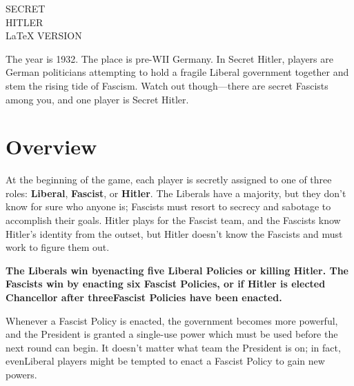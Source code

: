 \documentclass[13pt,a4paper,twocolumn,titlepage]{scrartcl}
\begin{document}
	\normalfont
	
	\begin{titlepage}
		\centering
		\vspace*{\fill}
		\fontsize{130}{130}\selectfont SECRET\\HITLER\\
		\vspace{2cm}
		\fontsize{45}{45}\selectfont LaTeX VERSION
		\vspace*{\fill}
	\end{titlepage}

	The year is 1932. The place is pre-WII Germany. In Secret Hitler​, players are German politicians attempting to hold a fragile \textcolor{liberal}{Liberal} government together and stem the rising tide of \textcolor{fascist}{Fascism}. Watch out though—there are secret \textcolor{fascist}{Fascists} among you, and one player is \textcolor{fascist}{Secret Hitler}.
	
	\section*{Overview}
	At the beginning of the game, each player is secretly assigned to one of three roles: 
	\textcolor{liberal}{\textbf{Liberal}}​, \textcolor{fascist}{\textbf{Fascist}​}, or \textcolor{fascist}{​\textbf{Hitler}​}. The \textcolor{liberal}{Liberals} have a majority, but they don’t know for sure who anyone is; \textcolor{fascist}{Fascists} must resort to secrecy and sabotage to accomplish their goals. \textcolor{fascist}{Hitler} plays for the \textcolor{fascist}{Fascist} team, and the \textcolor{fascist}{Fascists} know \textcolor{fascist}{Hitler}’s identity from the outset, but \textcolor{fascist}{Hitler} doesn’t know the \textcolor{fascist}{Fascists} and must work to figure them out.
	
	\textbf{The \textcolor{liberal}{Liberals} win by ​enacting five \textcolor{liberal}{Liberal} Policies​ or killing \textcolor{fascist}{​Hitler}​. The \textcolor{fascist}{​Fascists} win by ​enacting six \textcolor{fascist}{​Fascist​} Policies, or if ​\textcolor{fascist}{​Hitler} is elected Chancellor​ after three \textcolor{fascist}{​Fascist} Policies have been enacted.}
	
	Whenever a \textcolor{fascist}{​Fascist} Policy is enacted, the government becomes more powerful, and the President is granted a single-use power which must be used before the next round can begin. It doesn’t matter what team the President is on; in fact, even \textcolor{liberal}{​Liberal} players might be tempted to enact a \textcolor{fascist}{​Fascist} Policy to gain new powers.
	
\end{document}
